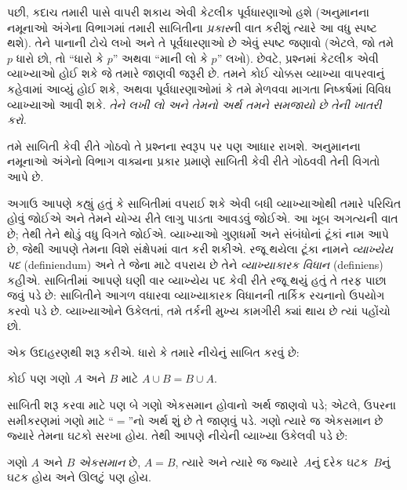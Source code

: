 પછી, કદાચ તમારી પાસે વાપરી શકાય એવી કેટલીક પૂર્વધારણાઓ હશે
(અનુમાનના નમૂનાઓ અંગેના વિભાગમાં તમારી સાબિતીના \emph{પ્રકાર}ની વાત કરીશું ત્યારે
આ વધુ સ્પષ્ટ થશે). તેને પાનાની ટોચે લખો અને તે પૂર્વધારણાઓ છે
એવું સ્પષ્ટ જણાવો (એટલે, જો તમે $p$ ધારો છો, તો ``ધારો કે $p$''
અથવા ``માની લો કે $p$'' લખો). છેવટે, પ્રશ્નમાં કેટલીક એવી
વ્યાખ્યાઓ હોઈ શકે જે તમારે જાણવી જરૂરી છે. તમને કોઈ ચોક્કસ
વ્યાખ્યા વાપરવાનું કહેવામાં આવ્યું હોઈ શકે, અથવા પૂર્વધારણાઓમાં
કે તમે મેળવવા માગતા નિષ્કર્ષમાં વિવિધ વ્યાખ્યાઓ આવી શકે.
\emph{તેને લખી લો અને તેમનો અર્થ તમને સમજાયો છે તેની ખાતરી કરો.}

તમે સાબિતી કેવી રીતે ગોઠવો તે પ્રશ્નના સ્વરૂપ પર પણ આધાર રાખશે.
અનુમાનના નમૂનાઓ અંગેનો વિભાગ વાક્યના પ્રકાર પ્રમાણે સાબિતી કેવી રીતે ગોઠવવી તેની
વિગતો આપે છે.
\endgroup


\begingroup
\makeatletter{}\makeatother


\label{guunit:OLP-0605}


અગાઉ આપણે કહ્યું હતું કે સાબિતીમાં વપરાઈ શકે એવી બધી વ્યાખ્યાઓથી
તમારે પરિચિત હોવું જોઈએ અને તેમને યોગ્ય રીતે લાગુ પાડતા આવડવું
જોઈએ. આ ખૂબ અગત્યની વાત છે; તેથી તેને થોડું વધુ વિગતે જોઈએ.
વ્યાખ્યાઓ ગુણધર્મો અને સંબંધોનાં ટૂંકાં નામ આપે છે, જેથી આપણે
તેમના વિશે સંક્ષેપમાં વાત કરી શકીએ. રજૂ થયેલા ટૂંકા નામને
\emph{વ્યાખ્યેય પદ} (definiendum) અને તે જેના માટે વપરાય છે તેને
\emph{વ્યાખ્યાકારક વિધાન} (definiens) કહીએ. સાબિતીમાં આપણે ઘણી વાર
વ્યાખ્યેય પદ કેવી રીતે રજૂ થયું હતું તે તરફ પાછા જવું પડે છે:
સાબિતીને આગળ વધારવા વ્યાખ્યાકારક વિધાનની તાર્કિક રચનાનો ઉપયોગ
કરવો પડે છે. વ્યાખ્યાઓને ઉકેલતાં, તમે તર્કની મુખ્ય કામગીરી ક્યાં
થાય છે ત્યાં પહોંચો છો.

એક ઉદાહરણથી શરૂ કરીએ. ધારો કે તમારે નીચેનું સાબિત કરવું છે:

\begin{prop}
કોઈ પણ ગણો $A$ અને $B$ માટે $A \cup B = B \cup A$.
\end{prop}

સાબિતી શરૂ કરવા માટે પણ બે ગણો એકસમાન હોવાનો અર્થ જાણવો પડે;
એટલે, ઉપરના સમીકરણમાં ગણો માટે ``$=$''નો અર્થ શું છે તે જાણવું પડે.
ગણો ત્યારે જ એકસમાન છે જ્યારે તેમના ઘટકો સરખા હોય.
તેથી આપણે નીચેની વ્યાખ્યા ઉકેલવી પડે છે:

\begin{defn}
ગણો $A$ અને $B$ \emph{એકસમાન} છે, $A = B$, ત્યારે અને ત્યારે જ
જ્યારે~$A$નું દરેક ઘટક~$B$નું ઘટક હોય અને ઊલટું પણ હોય.
\end{defn}

